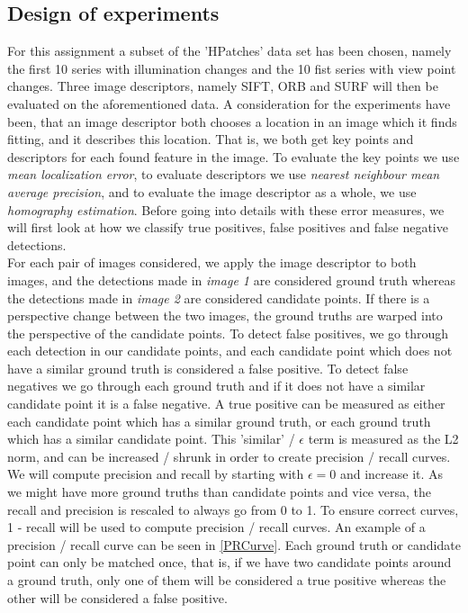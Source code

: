 \subsection{Design of experiments}
For this assignment a subset of the 'HPatches' data set has been chosen, namely the first 10 series with illumination changes and the 10 fist series with view point changes. Three image descriptors, namely SIFT, ORB and SURF  will then be evaluated on the aforementioned data. A consideration for the experiments have been, that an image descriptor both chooses a location in an image which it finds fitting, and it describes this location. That is, we both get key points and descriptors for each found feature in the image. To evaluate the key points we use \textit{mean localization error}, to evaluate descriptors we use \textit{nearest neighbour mean average precision}, and to evaluate the image descriptor as a whole, we use \textit{homography estimation}. Before going into details with these error measures, we will first look at how we classify true positives, false positives and false negative detections.\\
For each pair of images considered, we apply the image descriptor to both images, and the detections made in \textit{image 1} are considered ground truth whereas the detections made in \textit{image 2} are considered candidate points. If there is a perspective change between the two images, the ground truths are warped into the perspective of the candidate points. To detect false positives, we go through each detection in our candidate points, and each candidate point which does not have a similar ground truth is considered a false positive. To detect false negatives we go through each ground truth and if it does not have a similar candidate point it is a false negative. A true positive can be measured as either each candidate point which has a similar ground truth, or each ground truth which has a similar candidate point. This 'similar' / $\epsilon$ term is measured as the L2 norm, and can be increased / shrunk in order to create precision / recall curves. We will compute precision and recall by starting with $\epsilon = 0$ and increase it.
As we might have more ground truths than candidate points and vice versa, the recall and precision is rescaled to always go from 0 to 1. 
To ensure correct curves, 1 - recall will be used to compute precision / recall curves. An example of a precision / recall curve can be seen in \autoref{PRCurve}. Each ground truth or candidate point can only be matched once, that is, if we have two candidate points around a ground truth, only one of them will be considered a true positive whereas the other will be considered a false positive.

